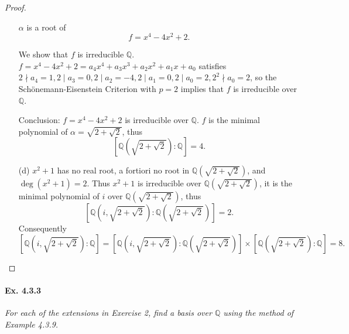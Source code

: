 \documentclass[11pt,a4paper]{article}
\newcommand{\Q}{\mathbb{Q}}
\begin{document}
\begin{proof}
\begin{enumerate}
 $\alpha$ is a root of
$$f= x^4-4x^2+2.$$

We show that $f$ is irreducible $\Q$.
$f= x^4-4x^2+2 = a_4x^4+a_3x^3+a_2x^2+a_1x+a_0$ satisfies
$2 \nmid a_4 =1, 2 \mid a_3=0,2\mid a_2=-4, 2 \mid a_1=0,2 \mid a_0=2,  2^2 \nmid a_0 = 2$, so 
the Sch\"onemann-Eisenstein Criterion with $p=2$ implies that $f$ is irreducible over $\mathbb{Q}$.


Conclusion: $f = x^4 -4x^2+2$ is irreducible over $\Q$. $f$ is the minimal polynomial of $\alpha = \sqrt{2+\sqrt{2}}$, thus
$$\left[\Q\left(\sqrt{2+\sqrt{2}}\right):\Q\right]=4.$$

\item[(d)]
$x^2+1$ has no real root, a fortiori no root in $\Q(\sqrt{2+\sqrt{2}})$, and $\deg(x^2+1) = 2$. Thus $x^2+1$ is irreducible over $\Q(\sqrt{2+\sqrt{2}})$, it is the minimal polynomial of $i$ over $\Q(\sqrt{2+\sqrt{2}})$, thus
$$\left [\Q\left(i,\sqrt{2+\sqrt{2}}\right):\Q\left(\sqrt{2+\sqrt{2}}\right)\right]=2.$$
Consequently
$$\left [\Q\left(i,\sqrt{2+\sqrt{2}}\right):\Q\right]=\left [\Q\left(i,\sqrt{2+\sqrt{2}}\right):\Q\left(\sqrt{2+\sqrt{2}}\right)\right] \times \left[\Q\left(\sqrt{2+\sqrt{2}}\right):\Q\right] = 8.$$
\end{enumerate}
\end{proof}

\paragraph{Ex. 4.3.3}

{\it For each of the extensions in Exercise 2, find a basis over $\Q$ using the method of Example 4.3.9.
}
\end{document}
